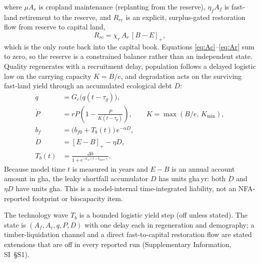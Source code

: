 \documentclass[preprint,12pt,authoryear]{elsarticle}
\newcommand{\pos}[1]{\left[#1\right]_+}
\begin{document}
where $\mu A_r$ is cropland maintenance (replanting from the reserve), $\eta_f A_f$ is fast-land retirement to the reserve, and $R_{rc}$ is an explicit, surplus-gated restoration flow from reserve to capital land,
\begin{equation}\label{eq:Rrc}
R_{rc}=\chi_r\,A_r\,\pos{B-E},
\end{equation}
which is the only route back into the capital book. Equations \eqref{eq:Ac}--\eqref{eq:Ar} sum to zero, so the reserve is a constrained balance rather than an independent state. Quality regenerates with a recruitment delay, population follows a delayed logistic law \citep{Pearl1925,Hutchinson1948} on the carrying capacity $K=B/e$, and degradation acts on the surviving fast-land yield through an accumulated ecological debt $D$:
\begin{align}
\dot q&=G_c\big(q(t-\tau_g)\big),\label{eq:q}\\
\dot P&=rP\left(1-\frac{P}{K(t-\tau_p)}\right),\qquad K=\max(B/e,\,K_{\min}),\label{eq:P}\\
b_f&=\big(b_{f0}+T_b(t)\big)\,e^{-\alpha D},\label{eq:bf}\\
\dot D&=\pos{E-B}-\eta D,\label{eq:D}\\
T_b(t)&=\frac{\Delta b}{1+e^{-\kappa_w(t-t_{wave})}}.\label{eq:Tb}
\end{align}
Because model time $t$ is measured in years and $E-B$ is an annual account amount in gha, the leaky shortfall accumulator $D$ has units gha\,yr: both $\dot D$ and $\eta D$ have units gha. This is a model-internal time-integrated liability, not an NFA-reported footprint or biocapacity item.

The technology wave $T_b$ is a bounded logistic yield step (off unless stated). The state is $(A_f,A_c,q,P,D)$ with one delay each in regeneration and demography; a timber-liquidation channel and a direct fast-to-capital restoration flow are stated extensions that are off in every reported run (Supplementary Information, SI~\S S1).
\end{document}

